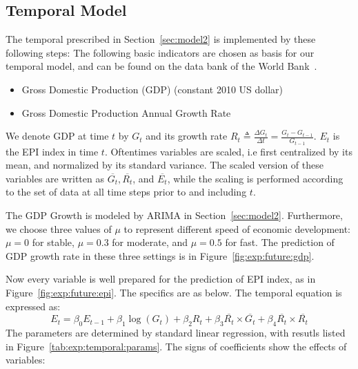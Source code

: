 \subsection{Temporal Model}
\label{sec:exp:temporal}
The temporal prescribed in Section~\ref{sec:model2} is implemented by these following steps:
    The following basic indicators are chosen as basis for our temporal model, and can be found on the data bank of the World Bank~\cite{world_bank}.
    \begin{itemize}
       \item Gross Domestic Production (GDP) (constant 2010 US dollar) 
       \item Gross Domestic Production Annual Growth Rate
    \end{itemize}
    We denote GDP at time $t$ by $G_t$ and its growth rate $R_t
    \triangleq\frac{\Delta G_t}{\Delta t} = \frac{G_t-G_{t-1}}{G_{t-1}}$. $E_t$ is the EPI index in time $t$. Oftentimes variables are scaled, i.e first centralized by its mean, and normalized by its standard variance.
    The scaled version of these variables are written as $\overline{G_t}, \overline{R_t}$, and $\overline{E_t}$, while the scaling is performed according to the set of data at all time steps prior to and including $t$.

The GDP Growth is modeled by ARIMA in Section~\ref{sec:model2}.
Furthermore, we choose three values of $\mu$ to represent different speed of economic development: $\mu=0$ for stable, $\mu=0.3$ for moderate, and $\mu=0.5$ for fast.
The prediction of GDP growth rate in these three settings is in Figure~\ref{fig:exp:future:gdp}.


    Now every variable is well prepared for the prediction of EPI index, as in Figure~\ref{fig:exp:future:epi}. The specifics are as below.
    The temporal equation is expressed as:
    \begin{equation}
       E_t = \beta_0 E_{t-1} + \beta_1 \log(G_t) + \beta_2 R_t + \beta_3 \overline{R_t}\times\overline{G_t} + \beta_4\overline{R_t}\times\overline{R_t}
       \label{eqn:exp:temporal:regression}
    \end{equation}
    The parameters are determined by standard linear regression, with resutls listed in Figure~\ref{tab:exp:temporal:params}. The signs of coefficients show the effects of variables:
    
